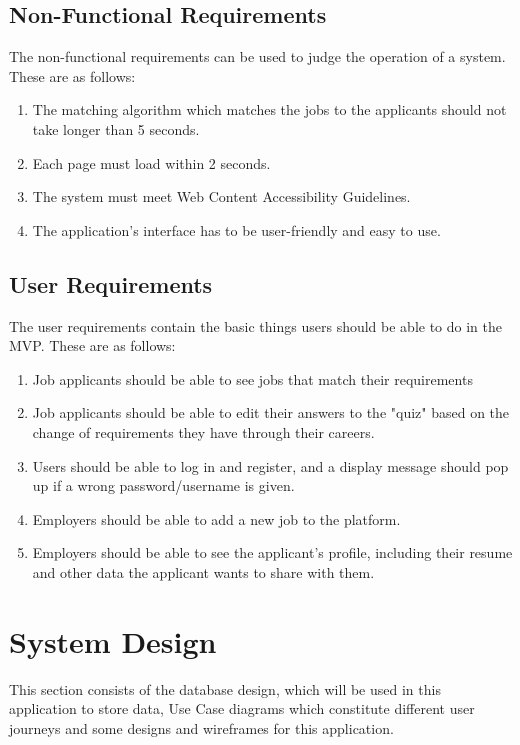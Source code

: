 \subsection{Non-Functional Requirements}
The non-functional requirements can be used to judge the operation of a system. These are as follows:
\begin{enumerate}
    \item The matching algorithm which matches the jobs to the applicants should not take longer than 5 seconds.
    \item Each page must load within 2 seconds.
    \item The system must meet Web Content Accessibility Guidelines. \parencite{Reference30}
    \item The application's interface has to be user-friendly and easy to use.
\end{enumerate}

\subsection{User Requirements}
The user requirements contain the basic things users should be able to do in the MVP. These are as follows:
\begin{enumerate}
    \item Job applicants should be able to see jobs that match their requirements
    \item Job applicants should be able to edit their answers to the "quiz" based on the change of requirements they have through their careers.
    \item Users should be able to log in and register, and a display message should pop up if a wrong password/username is given.
    \item Employers should be able to add a new job to the platform.
    \item Employers should be able to see the applicant's profile, including their resume and other data the applicant wants to share with them.
\end{enumerate}

\section{System Design}
This section consists of the database design, which will be used in this application to store data, Use Case diagrams which constitute different user journeys and some designs and wireframes for this application. 


